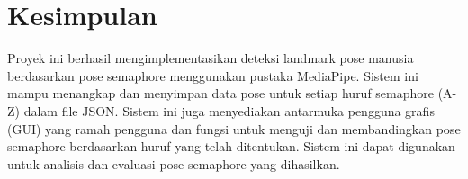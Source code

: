\documentclass[a4paper,12pt]{article}
\begin{document}
\section{Kesimpulan}
\begin{justify}
    Proyek ini berhasil mengimplementasikan deteksi landmark pose manusia berdasarkan pose semaphore menggunakan pustaka MediaPipe. Sistem ini mampu menangkap dan menyimpan data pose untuk setiap huruf semaphore (A-Z) dalam file JSON. Sistem ini juga menyediakan antarmuka pengguna grafis (GUI) yang ramah pengguna dan fungsi untuk menguji dan membandingkan pose semaphore berdasarkan huruf yang telah ditentukan. Sistem ini dapat digunakan untuk analisis dan evaluasi pose semaphore yang dihasilkan.
\end{justify}
\end{document}
